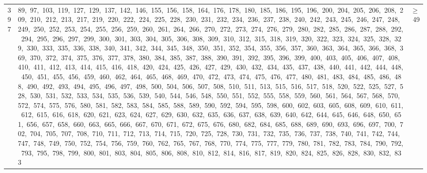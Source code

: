 \begin{longtable}{c|p{}|r}
397 & 89,\ 97,\ 103,\ 119,\ 127,\ 129,\ 137,\ 142,\ 146,\ 155,\ 156,\ 158,\ 164,\ 176,\ 178,\ 180,\ 185,\ 186,\ 195,\ 196,\ 200,\ 204,\ 205,\ 206,\ 208,\ 209,\ 210,\ 212,\ 213,\ 217,\ 219,\ 220,\ 222,\ 224,\ 225,\ 228,\ 230,\ 231,\ 232,\ 234,\ 236,\ 237,\ 238,\ 240,\ 242,\ 243,\ 245,\ 246,\ 247,\ 248,\ 249,\ 250,\ 252,\ 253,\ 254,\ 255,\ 256,\ 259,\ 260,\ 261,\ 264,\ 266,\ 270,\ 272,\ 273,\ 274,\ 276,\ 279,\ 280,\ 282,\ 285,\ 286,\ 287,\ 288,\ 292,\ 294,\ 295,\ 296,\ 297,\ 299,\ 300,\ 301,\ 303,\ 304,\ 305,\ 306,\ 308,\ 309,\ 310,\ 312,\ 315,\ 318,\ 319,\ 320,\ 322,\ 323,\ 324,\ 325,\ 328,\ 329,\ 330,\ 333,\ 335,\ 336,\ 338,\ 340,\ 341,\ 342,\ 344,\ 345,\ 348,\ 350,\ 351,\ 352,\ 354,\ 355,\ 356,\ 357,\ 360,\ 363,\ 364,\ 365,\ 366,\ 368,\ 369,\ 370,\ 372,\ 374,\ 375,\ 376,\ 377,\ 378,\ 380,\ 384,\ 385,\ 387,\ 388,\ 390,\ 391,\ 392,\ 395,\ 396,\ 399,\ 400,\ 403,\ 405,\ 406,\ 407,\ 408,\ 410,\ 411,\ 412,\ 413,\ 414,\ 415,\ 416,\ 418,\ 420,\ 424,\ 425,\ 426,\ 427,\ 429,\ 430,\ 432,\ 434,\ 435,\ 437,\ 438,\ 440,\ 441,\ 442,\ 444,\ 448,\ 450,\ 451,\ 455,\ 456,\ 459,\ 460,\ 462,\ 464,\ 465,\ 468,\ 469,\ 470,\ 472,\ 473,\ 474,\ 475,\ 476,\ 477,\ 480,\ 481,\ 483,\ 484,\ 485,\ 486,\ 488,\ 490,\ 492,\ 493,\ 494,\ 495,\ 496,\ 497,\ 498,\ 500,\ 504,\ 506,\ 507,\ 508,\ 510,\ 511,\ 513,\ 515,\ 516,\ 517,\ 518,\ 520,\ 522,\ 525,\ 527,\ 528,\ 530,\ 531,\ 532,\ 533,\ 534,\ 535,\ 536,\ 539,\ 540,\ 544,\ 546,\ 548,\ 550,\ 551,\ 552,\ 555,\ 558,\ 559,\ 560,\ 561,\ 564,\ 567,\ 568,\ 570,\ 572,\ 574,\ 575,\ 576,\ 580,\ 581,\ 582,\ 583,\ 584,\ 585,\ 588,\ 589,\ 590,\ 592,\ 594,\ 595,\ 598,\ 600,\ 602,\ 603,\ 605,\ 608,\ 609,\ 610,\ 611,\ 612,\ 615,\ 616,\ 618,\ 620,\ 621,\ 623,\ 624,\ 627,\ 629,\ 630,\ 632,\ 635,\ 636,\ 637,\ 638,\ 639,\ 640,\ 642,\ 644,\ 645,\ 646,\ 648,\ 650,\ 651,\ 656,\ 657,\ 658,\ 660,\ 663,\ 665,\ 666,\ 667,\ 670,\ 671,\ 672,\ 675,\ 676,\ 680,\ 682,\ 684,\ 685,\ 688,\ 689,\ 690,\ 693,\ 696,\ 697,\ 700,\ 702,\ 704,\ 705,\ 707,\ 708,\ 710,\ 711,\ 712,\ 713,\ 714,\ 715,\ 720,\ 725,\ 728,\ 730,\ 731,\ 732,\ 735,\ 736,\ 737,\ 738,\ 740,\ 741,\ 742,\ 744,\ 747,\ 748,\ 749,\ 750,\ 752,\ 754,\ 756,\ 759,\ 760,\ 762,\ 765,\ 767,\ 768,\ 770,\ 774,\ 775,\ 777,\ 779,\ 780,\ 781,\ 782,\ 783,\ 784,\ 790,\ 792,\ 793,\ 795,\ 798,\ 799,\ 800,\ 801,\ 803,\ 804,\ 805,\ 806,\ 808,\ 810,\ 812,\ 814,\ 816,\ 817,\ 819,\ 820,\ 824,\ 825,\ 826,\ 828,\ 830,\ 832,\ 833 & $\ge$ 49 \\

\end{longtable}
